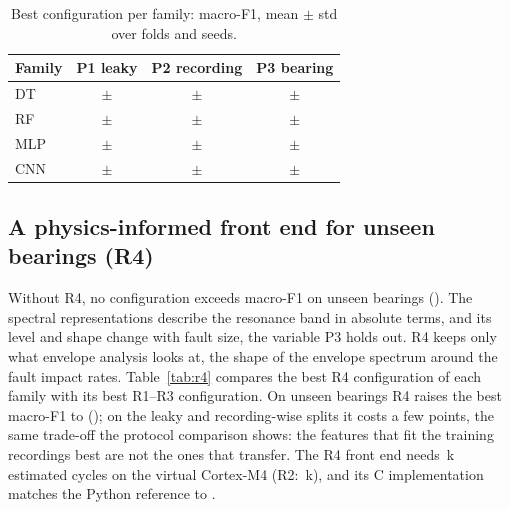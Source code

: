 \begin{table}[t]
\centering
\caption{Best configuration per family: macro-F1, mean $\pm$ std over folds and seeds.}
\label{tab:f1}
\setlength{\tabcolsep}{3pt}
\begin{tabular}{lccc}
\toprule
Family & P1 leaky & P2 recording & P3 bearing \\
\midrule
DT  & \NumPOneDTBest{}$\pm$\NumPOneDTBestStd{} & \NumPTwoDTBest{}$\pm$\NumPTwoDTBestStd{} & \NumPThreeDTBest{}$\pm$\NumPThreeDTBestStd{}\\
RF  & \NumPOneRFBest{}$\pm$\NumPOneRFBestStd{} & \NumPTwoRFBest{}$\pm$\NumPTwoRFBestStd{} & \NumPThreeRFBest{}$\pm$\NumPThreeRFBestStd{}\\
MLP & \NumPOneMLPBest{}$\pm$\NumPOneMLPBestStd{} & \NumPTwoMLPBest{}$\pm$\NumPTwoMLPBestStd{} & \NumPThreeMLPBest{}$\pm$\NumPThreeMLPBestStd{}\\
CNN & \NumPOneCNNBest{}$\pm$\NumPOneCNNBestStd{} & \NumPTwoCNNBest{}$\pm$\NumPTwoCNNBestStd{} & \NumPThreeCNNBest{}$\pm$\NumPThreeCNNBestStd{}\\
\bottomrule
\end{tabular}
\end{table}

\subsection{A physics-informed front end for unseen bearings (R4)}
\label{sec:r4}
Without R4, no configuration exceeds \NumPThreeNoRFourBest{} macro-F1 on unseen bearings
(\NumPThreeNoRFourBestModel{}). The spectral representations describe the resonance band in absolute terms, and its
level and shape change with fault size, the variable P3 holds out. R4 keeps only what envelope analysis looks at, the
shape of the envelope spectrum around the fault impact rates. Table~\ref{tab:r4} compares the best R4 configuration of
each family with its best R1--R3 configuration. On unseen bearings R4 raises the best macro-F1 to \NumPThreeRFourBest{}
(\NumPThreeRFourBestModel{}); on the leaky and recording-wise splits it costs a few points, the same trade-off the
protocol comparison shows: the features that fit the training recordings best are not the ones that transfer. The R4
front end needs \NumFeRFourKcyc{}\,k estimated cycles on the virtual Cortex-M4 (R2: \NumFeRTwoKcyc{}\,k), and its C
implementation matches the Python reference to \NumParityRFour{}.

